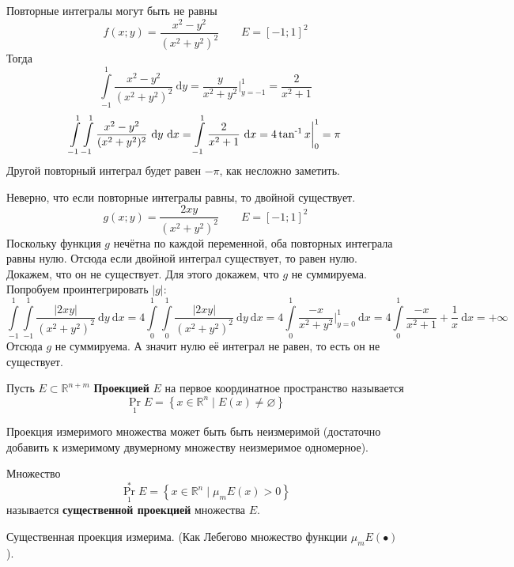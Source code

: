 \documentclass{article}
\begin{document}
    \begin{example}
        Повторные интегралы могут быть не равны
        $$
        f(x;y)=\frac{x^2-y^2}{(x^2+y^2)^2}\qquad E=[-1;1]^2
        $$
        Тогда
        $$
        \int\limits_{-1}^1 \frac{x^2-y^2}{(x^2+y^2)^2}~\mathrm dy=\frac y{x^2+y^2}\bigg|_{y=-1}^1=\frac2{x^2+1}
        $$
        $$
        \int\limits_{-1}^1 \int\limits_{-1}^1 \frac{x^2-y^2}{(x^2+y^2)^2}~\mathrm dy~\mathrm dx=\int\limits_{-1}^1 \frac2{x^2+1}~\mathrm dx=4\operatorname{\tan^{-1}} x\bigg|_0^1=\pi
        $$
        Другой повторный интеграл будет равен $-\pi$, как несложно заметить.
    \end{example}
    \begin{example}
        Неверно, что если повторные интегралы равны, то двойной существует.
        $$
        g(x;y)=\frac{2xy}{(x^2+y^2)^2}\qquad E=[-1;1]^2
        $$
        Поскольку функция $g$ нечётна по каждой переменной, оба повторных интеграла равны нулю. Отсюда если двойной интеграл существует, то равен нулю.\\
        Докажем, что он не существует. Для этого докажем, что $g$ не суммируема. Попробуем проинтегрировать $|g|$:
        $$
        \int\limits_{-1}^1\int\limits_{-1}^1\frac{|2xy|}{(x^2+y^2)^2}~\mathrm dy~\mathrm dx=
        4\int\limits_0^1\int\limits_0^1\frac{|2xy|}{(x^2+y^2)^2}~\mathrm dy~\mathrm dx=
        4\int\limits_0^1\frac{-x}{x^2+y^2}\bigg|_{y=0}^1~\mathrm dx=
        4\int\limits_0^1\frac{-x}{x^2+1}+\frac1x~\mathrm dx=+\infty
        $$
        Отсюда $g$ не суммируема. А значит нулю её интеграл не равен, то есть он не существует.
    \end{example}
    \begin{definition}
        Пусть $E\subset\mathbb R^{n+m}$ \textbf{Проекцией} $E$ на первое координатное пространство называется
        $$
        \operatorname{Pr}_1E=\left\{x\in\mathbb R^n\mid E(x)\neq\varnothing\right\}
        $$
    \end{definition}
    \begin{remark}
        Проекция измеримого множества может быть быть неизмеримой (достаточно добавить к измеримому двумерному множеству неизмеримое одномерное).
    \end{remark}
    \begin{definition}
        Множество
        $$
        \operatorname{Pr}^*_1E=\left\{x\in\mathbb R^n\mid \mu_m E(x)>0\right\}
        $$
        называется \textbf{существенной проекцией} множества $E$.
    \end{definition}
    \begin{property}
        Существенная проекция измерима. (Как Лебегово множество функции $\mu_m E(\bullet)$).
    \end{property}
\end{document}
